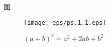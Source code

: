 \documentclass[main.tex]{subfiles}
\begin{document}
图

\begin{figure}[h]
	\centering
	\texttt{[image: eps/ps.1.1.eps]}
	\caption{$(a+b)^2 = a^2 + 2ab + b^2$}
	\label{fig:chap1.5.1}
\end{figure}	
\end{document}
